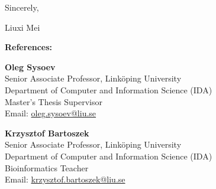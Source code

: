 \documentclass[11pt,a4paper]{article}
\begin{document}
Sincerely,

Liuxi Mei

\vspace{0.5cm}
\noindent
\begin{minipage}{\textwidth}
\textbf{References:}

\vspace{0.3cm}
\begin{minipage}[t]{0.48\textwidth}
\textbf{Oleg Sysoev}\\
Senior Associate Professor, Linköping University\\
Department of Computer and Information Science (IDA)\\
Master's Thesis Supervisor\\
Email: \href{mailto:oleg.sysoev@liu.se}{oleg.sysoev@liu.se}
\end{minipage}%
\hfill
\begin{minipage}[t]{0.48\textwidth}
\textbf{Krzysztof Bartoszek}\\
Senior Associate Professor, Linköping University\\
Department of Computer and Information Science (IDA)\\
Bioinformatics Teacher\\
Email: \href{mailto:krzysztof.bartoszek@liu.se}{krzysztof.bartoszek@liu.se}
\end{minipage}
\end{minipage}
\end{document}
